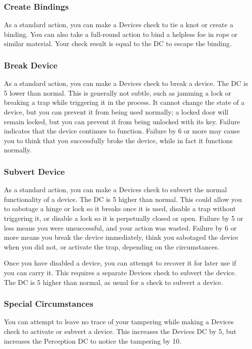 \subsubsection{Create Bindings}
As a standard action, you can make a Devices check to tie a knot or create a binding. You can also take a full-round action to bind a helpless foe in rope or similar material. Your check result is equal to the DC to escape the binding.

\subsubsection{Break Device}
As a standard action, you can make a Devices check to break a device. The DC is 5 lower than normal. This is generally not subtle, such as jamming a lock or breaking a trap while triggering it in the process. It cannot change the state of a device, but you can prevent it from being used normally; a locked door will remain locked, but you can prevent it from being unlocked with its key. Failure indicates that the device continues to function. Failure by 6 or more may cause you to think that you successfully broke the device, while in fact it functions normally.

\subsubsection{Subvert Device}
As a standard action, you can make a Devices check to subvert the normal functionality of a device. The DC is 5 higher than normal. This could allow you to sabotage a hinge or lock so it breaks once it is used, disable a trap without triggering it, or disable a lock so it is perpetually closed or open. Failure by 5 or less means you were unsuccessful, and your action was wasted. Failure by 6 or more means you break the device immediately, think you sabotaged the device when you did not, or activate the trap, depending on the circumstances.

Once you have disabled a device, you can attempt to recover it for later use if you can carry it. This requires a separate Devices check to subvert the device. The DC is 5 higher than normal, as usual for a check to subvert a device.

\subsubsection{Special Circumstances}

You can attempt to leave no trace of your tampering while making a Devices check to activate or subvert a device. This increases the Devices DC by 5, but increases the Perception DC to notice the tampering by 10.

